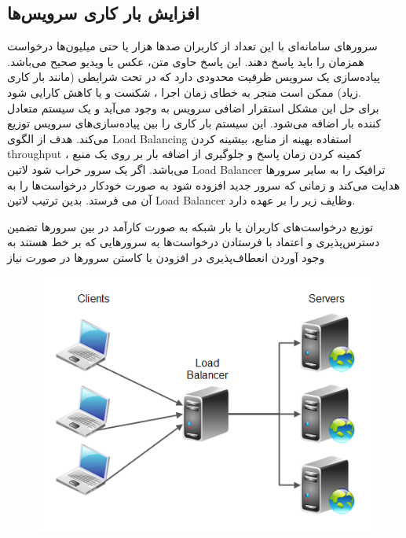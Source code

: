 \subsection{افزایش بار کاری سرویس‌ها}
سرور‌های سامانه‌ای با این تعداد از کاربران صدها هزار یا حتی میلیون‌ها درخواست همزمان را باید پاسخ دهند. این پاسخ حاوی متن، عکس یا ویدیو صحیح می‌باشد.  پیاده‌سازی یک سرویس ظرفیت محدودی دارد که در تحت شرایطی (مانند بار کاری زیاد) ممکن است منجر به خطای زمان اجرا ، شکست و یا کاهش کارایی شود.\\
 برای حل این مشکل استقرار اضافی  سرویس به وجود می‌آید و یک سیستم متعادل کننده بار  اضافه می‌شود. این سیستم بار کاری را بین پیاده‌سازی‌های سرویس توزیع می‌کند. هدف از الگوی Load Balancing استفاده بهینه از منابع، بیشینه کردن throughput ، کمینه کردن زمان پاسخ و جلوگیری از اضافه بار بر روی یک منبع می‌باشد. اگر یک سرور خراب شود ‌لاتین{ Load Balancer } ترافیک را به سایر سرور‌ها هدایت می‌کند و زمانی که سرور جدید افزوده شود به صورت خودکار درخواست‌ها را به آن می فرستد. بدین ترتیب ‌لاتین{ Load Balancer } وظایف زیر را بر عهده دارد.
 \begin{itemize}
 توزیع درخواست‌های کاربران یا بار شبکه به صورت کارآمد در بین سرور‌ها
  تضمین دسترس‌پذیری و اعتماد با فرستادن درخواست‌ها به سرور‌هایی که بر خط هستند
  به وجود آوردن انعطاف‌پذیری در افزودن یا کاستن سرور‌ها در صورت نیاز
 \end{itemize}
 
 \begin{figure}[H]
 \centering
 \includegraphics[scale=.6]{img/load-balancer.png}
 \end{figure}
 
